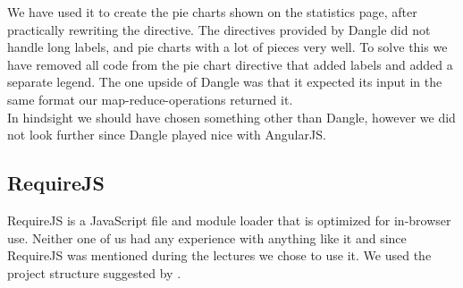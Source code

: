 	We have used it to create the pie charts shown on the statistics page, after practically rewriting the directive. The directives provided by Dangle did not handle long labels, and pie charts with a lot of pieces very well. To solve this we have removed all code from the pie chart directive that added labels and added a separate legend. The one upside of Dangle was that it expected its input in the same format our map-reduce-operations returned it. \\

	In hindsight we should have chosen something other than Dangle, however we did not look further since Dangle played nice with AngularJS. 

\subsection{RequireJS}
\label{ssec:1:requirejs}
	RequireJS is a JavaScript file and module loader that is optimized for in-browser use. Neither one of us had any experience with anything like it and since RequireJS was mentioned during the lectures we chose to use it. We used the project structure suggested by \textcite{angularjsbook}.